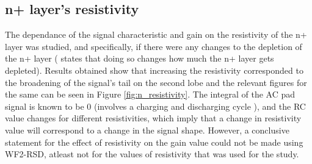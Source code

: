 \documentclass[11pt]{article}
\begin{document}
\subsection{n+ layer's resistivity}
The dependance of the signal characteristic and gain on the resistivity of the n+ layer was studied, and specifically, if there were any changes to the depletion of the n+ layer (\cite{giacomini-lgad} states that doing so changes how much the n+ layer gets depleted).
\newline
Results obtained show that increasing the resistivity corresponded to the broadening of the signal's tail on the second lobe and the relevant figures for the same can be seen in Figure \ref{fig:n_resistivity}. The integral of the AC pad signal is known to be 0 (involves a charging and discharging cycle \cite{Tornago2021}), and the RC value changes for different resistivities, which imply that a change in resistivity value will correspond to a change in the signal shape. However, a conclusive statement for the effect of resistivity on the gain value could not be made using WF2-RSD, atleast not for the values of resistivity that was used for the study.
\end{document}
